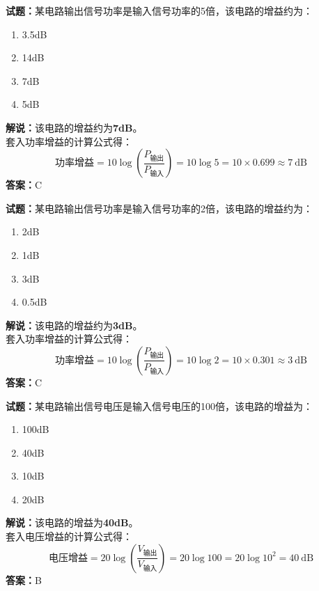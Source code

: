 \documentclass{ctexbook}
\begin{document}
\vspace{\baselineskip}

\noindent\textbf{试题：}某电路输出信号功率是输入信号功率的5倍，该电路的增益约为：
\begin{enumerate}[leftmargin=3em]
  \item 3.5dB
  \item 14dB
  \item 7dB
  \item 5dB
\end{enumerate}
\noindent\textbf{解说：}该电路的增益约为\textbf{7dB}。\\
套入功率增益的计算公式得：
$$\mbox{功率增益}=10 \log \left( {\frac{P_{ \mbox{输出} }}{P_{ \mbox{输入} }}} \right)=10 \log 5 = 10 \times 0.699 \approx 7 \ \mathrm{dB}$$
\noindent\textbf{答案：}C

\vspace{\baselineskip}

\noindent\textbf{试题：}某电路输出信号功率是输入信号功率的2倍，该电路的增益约为：
\begin{enumerate}[leftmargin=3em]
  \item 2dB
  \item 1dB
  \item 3dB
  \item 0.5dB
\end{enumerate}
\noindent\textbf{解说：}该电路的增益约为\textbf{3dB}。\\
套入功率增益的计算公式得：
$$\mbox{功率增益}=10 \log \left( {\frac{P_{ \mbox{输出} }}{P_{ \mbox{输入} }}} \right)=10 \log 2 = 10 \times 0.301 \approx 3 \ \mathrm{dB}$$
\noindent\textbf{答案：}C

\vspace{\baselineskip}

\noindent\textbf{试题：}某电路输出信号电压是输入信号电压的100倍，该电路的增益为：
\begin{enumerate}[leftmargin=3em]
  \item 100dB
  \item 40dB
  \item 10dB
  \item 20dB
\end{enumerate}
\noindent\textbf{解说：}该电路的增益为\textbf{40dB}。\\
套入电压增益的计算公式得：
$$\mbox{电压增益}=20 \log \left( {\frac{V_{ \mbox{输出} }}{V_{ \mbox{输入} }}} \right)=20 \log 100=20 \log 10^2= 40 \ \mathrm{dB}$$
\noindent\textbf{答案：}B

\vspace{\baselineskip}
\end{document}
